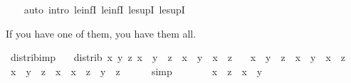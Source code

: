 \begin{isabellebody}
%
\isadelimproof
\ \ %
\endisadelimproof
%
\isatagproof
{}\isamarkupfalse%
\ {\isacharparenleft}{\kern0pt}auto\ intro{\isacharcolon}{\kern0pt}\ le{\isacharunderscore}{\kern0pt}infI{}\ le{\isacharunderscore}{\kern0pt}infI{}\ le{\isacharunderscore}{\kern0pt}supI{}\ le{\isacharunderscore}{\kern0pt}supI{}{\isacharparenright}{\kern0pt}%
\endisatagproof
{\isafoldproof}%
%
\isadelimproof
%
\endisadelimproof
%
\begin{isamarkuptext}%
If you have one of them, you have them all.%
\end{isamarkuptext}\isamarkuptrue%
\isamarkupfalse%
\ distrib{\isacharunderscore}{\kern0pt}imp{}{\isacharcolon}{\kern0pt}\isanewline
\ \ \ distrib{\isacharcolon}{\kern0pt}\ {\isachardoublequoteopen}{\isasymAnd}x\ y\ z{\isachardot}{\kern0pt}\ x\ {\isasymsqinter}\ {\isacharparenleft}{\kern0pt}y\ {\isasymsqunion}\ z{\isacharparenright}{\kern0pt}\ {\isacharequal}{\kern0pt}\ {\isacharparenleft}{\kern0pt}x\ {\isasymsqinter}\ y{\isacharparenright}{\kern0pt}\ {\isasymsqunion}\ {\isacharparenleft}{\kern0pt}x\ {\isasymsqinter}\ z{\isacharparenright}{\kern0pt}{\isachardoublequoteclose}\isanewline
\ \ \ {\isachardoublequoteopen}x\ {\isasymsqunion}\ {\isacharparenleft}{\kern0pt}y\ {\isasymsqinter}\ z{\isacharparenright}{\kern0pt}\ {\isacharequal}{\kern0pt}\ {\isacharparenleft}{\kern0pt}x\ {\isasymsqunion}\ y{\isacharparenright}{\kern0pt}\ {\isasymsqinter}\ {\isacharparenleft}{\kern0pt}x\ {\isasymsqunion}\ z{\isacharparenright}{\kern0pt}{\isachardoublequoteclose}\isanewline
%
\isadelimproof
%
\endisadelimproof
%
\isatagproof
{}\isamarkupfalse%
{\isacharminus}{\kern0pt}\isanewline
\ \ \isamarkupfalse%
\ {\isachardoublequoteopen}x\ {\isasymsqunion}\ {\isacharparenleft}{\kern0pt}y\ {\isasymsqinter}\ z{\isacharparenright}{\kern0pt}\ {\isacharequal}{\kern0pt}\ {\isacharparenleft}{\kern0pt}x\ {\isasymsqunion}\ {\isacharparenleft}{\kern0pt}x\ {\isasymsqinter}\ z{\isacharparenright}{\kern0pt}{\isacharparenright}{\kern0pt}\ {\isasymsqunion}\ {\isacharparenleft}{\kern0pt}y\ {\isasymsqinter}\ z{\isacharparenright}{\kern0pt}{\isachardoublequoteclose}\isanewline
\ \ \ \ \isamarkupfalse%
\ simp\isanewline
\ \ \isamarkupfalse%
\ \isamarkupfalse%
\ {\isachardoublequoteopen}{\isasymdots}\ {\isacharequal}{\kern0pt}\ x\ {\isasymsqunion}\ {\isacharparenleft}{\kern0pt}z\ {\isasymsqinter}\ {\isacharparenleft}{\kern0pt}x\ {\isasymsqunion}\ y{\isacharparenright}{\kern0pt}{\isacharparenright}{\kern0pt}{\isachardoublequoteclose}\isanewline

\end{isabellebody}
